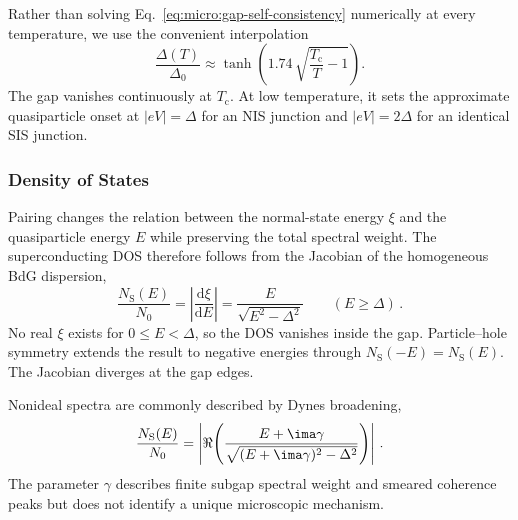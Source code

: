             Rather than solving Eq.~\eqref{eq:micro:gap-self-consistency} numerically at every temperature, we use the convenient interpolation
            \begin{equation}
                \frac{\Delta(T)}{\Delta_0}
                    \approx \tanh\!\left(
                        1.74\,\sqrt{\frac{T_\mathrm{c}}{T} - 1}
                    \right).
                \label{eq:micro:gap-temperature}
            \end{equation}
            The gap vanishes continuously at $T_\mathrm{c}$. At low temperature, it sets the approximate quasiparticle onset at $|eV|=\Delta$ for an NIS junction and $|eV|=2\Delta$ for an identical SIS junction. \cite{muhlschlegel_thermodynamischen_1959,tinkham_introduction_2004}

        \subsubsection*{Density of States}
        \label{subsubsec:micro:density-of-states}

            Pairing changes the relation between the normal-state energy $\xi$ and the quasiparticle energy $E$ while preserving the total spectral weight. The superconducting DOS therefore follows from the Jacobian of the homogeneous BdG dispersion,
            \begin{equation}
                \frac{N_\mathrm{S}(E)}{N_0}
                = \left|\frac{\mathrm d\xi}{\mathrm dE}\right|
                = \frac{E}{\sqrt{E^2-\Delta^2}}
                \qquad (E\geq\Delta)\,.
                \label{eq:micro:dos-bcs}
            \end{equation}
            No real $\xi$ exists for $0\leq E<\Delta$, so the DOS vanishes inside the gap. Particle--hole symmetry extends the result to negative energies through $N_\mathrm{S}(-E)=N_\mathrm{S}(E)$. The Jacobian diverges at the gap edges. \cite{bardeen_theory_1957,tinkham_introduction_2004}

            Nonideal spectra are commonly described by Dynes broadening,
            \begin{equation}
                \frac{N_\mathrm{S}(E)}{N_0}
                    = \left|\Re\!\left(
                        \frac{E+\ima\gamma}{
                        \sqrt{(E+\ima\gamma)^{2}-\Delta^{2}}}
                    \right)\right|\,.
                \label{eq:micro:dos-dynes}
            \end{equation}
            The parameter $\gamma$ describes finite subgap spectral weight and smeared coherence peaks but does not identify a unique microscopic mechanism. \cite{dynes_direct_1978,plecenik_finite-quasiparticle-lifetime_1994}

